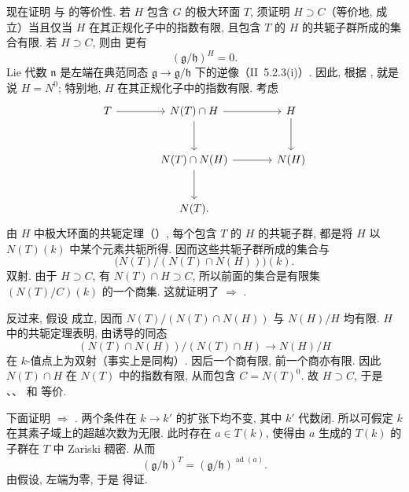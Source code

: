 现在证明  与  的等价性. 若 \(H\) 包含 \(G\) 的极大环面 \(T\), 须证明 \(H\supset C\)（等价地,  成立）当且仅当 \(H\) 在其正规化子中的指数有限, 且包含 \(T\) 的 \(H\) 的共轭子群所成的集合有限. 若 \(H\supset C\), 则由  更有
\[
\tag{xx}
  (\mathfrak g/\mathfrak h)^H=0.
\]
Lie 代数 \(\mathfrak n\) 是左端在典范同态 \(\mathfrak g\to\mathfrak g/\mathfrak h\) 下的逆像（II~5.2.3(i)）. 因此, 根据 ,  就是说 \(H=N^0\); 特别地, \(H\) 在其正规化子中的指数有限. 考虑
\[
\begin{tikzcd}[column sep=large,row sep=large]
T \arrow[r] &
N(T)\cap H \arrow[r] \arrow[d] &
H \arrow[d] \\
{} &
N(T)\cap N(H) \arrow[r] \arrow[d] &
N(H) \\
{} &
N(T). &
\end{tikzcd}
\]
由 \(H\) 中极大环面的共轭定理（）, 每个包含 \(T\) 的 \(H\) 的共轭子群, 都是将 \(H\) 以 \(N(T)(k)\) 中某个元素共轭所得. 因而这些共轭子群所成的集合与
\[
  \bigl(N(T)/(N(T)\cap N(H))\bigr)(k).
\]
双射. 由于 \(H\supset C\), 有 \(N(T)\cap H\supset C\), 所以前面的集合是有限集 \((N(T)/C)(k)\) 的一个商集. 这就证明了  \(\Rightarrow\) .

反过来, 假设  成立, 因而 \(N(T)/(N(T)\cap N(H))\) 与 \(N(H)/H\) 均有限. \(H\) 中的共轭定理表明, 由诱导的同态
\[
  (N(T)\cap N(H))/(N(T)\cap H)\longrightarrow N(H)/H
\]
在 \(k\)-值点上为双射（事实上是同构）. 因后一个商有限, 前一个商亦有限. 因此 \(N(T)\cap H\) 在 \(N(T)\) 中的指数有限, 从而包含 \(C=N(T)^0\). 故 \(H\supset C\), 于是 、、 和  等价.

下面证明  \(\Rightarrow\) . 两个条件在 \(k\to k'\) 的扩张下均不变, 其中 \(k'\) 代数闭. 所以可假定 \(k\) 在其素子域上的超越次数为无限. 此时存在 \(a\in T(k)\), 使得由 \(a\) 生成的 \(T(k)\) 的子群在 \(T\) 中 Zariski 稠密. 从而
\[
  (\mathfrak g/\mathfrak h)^T
  =(\mathfrak g/\mathfrak h)^{\operatorname{ad}(a)}.
\]
由假设, 左端为零, 于是  得证.

